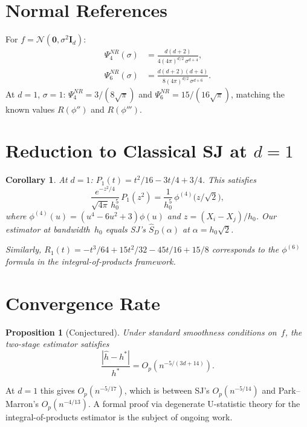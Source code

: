 \documentclass[12pt]{article}
\newtheorem{corollary}[theorem]{Corollary}
\newtheorem{proposition}[theorem]{Proposition}
\newcommand{\Id}{\bm{I}_d}
\begin{document}
\section{Normal References}
\label{sec:supp_NR}

For $f = \mathcal{N}(\bm 0, \sigma^2\Id)$:
\begin{align*}
\Psi_4^{NR}(\sigma) &= \frac{d(d+2)}{4(4\pi)^{d/2}\,\sigma^{d+4}}, \\
\Psi_6^{NR}(\sigma) &= \frac{d(d+2)(d+4)}{8(4\pi)^{d/2}\,\sigma^{d+6}}.
\end{align*}
At $d{=}1$, $\sigma{=}1$: $\Psi_4^{NR} = 3/(8\sqrt\pi)$ and $\Psi_6^{NR} = 15/(16\sqrt\pi)$, matching the known values $R(\phi'')$ and $R(\phi''')$.

\section{Reduction to Classical SJ at $d=1$}
\label{sec:supp_d1}

\begin{corollary}
\label{cor:d1}
At $d=1$: $P_1(t) = t^2/16 - 3t/4 + 3/4$. This satisfies
\[
\frac{e^{-z^2/4}}{\sqrt{4\pi}\,h_0^5}\,P_1(z^2) = \frac{1}{h_0^5}\,\phi^{(4)}\!\bigl(z/\sqrt2\bigr),
\]
where $\phi^{(4)}(u) = (u^4-6u^2+3)\phi(u)$ and $z = (X_i{-}X_j)/h_0$. Our estimator at bandwidth~$h_0$ equals SJ's $\hat S_D(\alpha)$ at $\alpha = h_0\sqrt2$.

Similarly, $R_1(t) = -t^3/64 + 15t^2/32 - 45t/16 + 15/8$ corresponds to the $\phi^{(6)}$ formula in the integral-of-products framework.
\end{corollary}

\section{Convergence Rate}
\label{sec:supp_rate}

\begin{proposition}[Conjectured]
Under standard smoothness conditions on~$f$, the two-stage estimator satisfies
\[
\frac{|\hat h - h^*|}{h^*} = O_p\!\left(n^{-5/(3d+14)}\right).
\]
\end{proposition}
At $d=1$ this gives $O_p(n^{-5/17})$, which is between SJ's $O_p(n^{-5/14})$ and Park--Marron's $O_p(n^{-4/13})$. A formal proof via degenerate U-statistic theory for the integral-of-products estimator is the subject of ongoing work.
\end{document}
